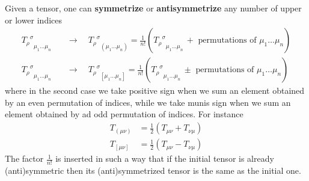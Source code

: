 \documentclass[../main/main.tex]{subfiles}
\begin{document}
\begin{definition}{}
Given a tensor, one can \textbf{symmetrize} or \textbf{antisymmetrize} any number of upper or lower indices
\begin{align*}
{{T_\rho}^\sigma}_{\mu_1\dots\mu_n}\quad&\longrightarrow\quad {{T_\rho}^\sigma}_{(\mu_1\dots\mu_n)}=
\frac1{n!}({{T_\rho}^\sigma}_{\mu_1\dots\mu_n}\,+\text{ permutations of }\mu_1\dots\mu_n)\\
{{T_\rho}^\sigma}_{\mu_1\dots\mu_n}\quad&\longrightarrow\quad {{T_\rho}^\sigma}_{[\mu_1\dots\mu_n]}=
\frac1{n!}({{T_\rho}^\sigma}_{\mu_1\dots\mu_n}\,\pm\text{ permutations of }\mu_1\dots\mu_n)
\end{align*}
where in the second case we take positive sign when we sum an element obtained by an even permutation of indices, while we take munis sign when we sum an element obtained by ad odd permutation of indices.
For instance
\begin{align*}
T_{(\mu\nu)}&=\frac12(T_{\mu\nu}+T_{\nu\mu})\\
T_{[\mu\nu]}&=\frac12(T_{\mu\nu}-T_{\nu\mu})
\end{align*}
The factor $\frac1{n!}$ is inserted in such a way that if the initial tensor is already (anti)symmetric then its (anti)symmetrized tensor is the same as the initial one. 

\end{definition}
\end{document}
